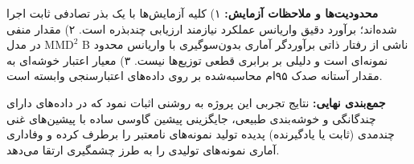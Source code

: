 \textbf{محدودیت‌ها و ملاحظات آزمایش:}
۱) کلیه آزمایش‌ها با یک بذر تصادفی ثابت اجرا شده‌اند؛ برآورد دقیق واریانس عملکرد نیازمند ارزیابی چندبذره است.
۲) مقدار منفی $\text{MMD}^2$ در مدل B ناشی از رفتار ذاتی برآوردگر آماری بدون‌سوگیری با واریانس محدود نمونه‌ای است و دلیلی بر برابری قطعی توزیع‌ها نیست.
۳) معیار اعتبار خوشه‌ای به مقدار آستانه صدک ۹۵ام محاسبه‌شده بر روی داده‌های اعتبارسنجی وابسته است.

\textbf{جمع‌بندی نهایی:} نتایج تجربی این پروژه به روشنی اثبات نمود که در داده‌های دارای چندگانگی و خوشه‌بندی طبیعی، جایگزینی پیشین گاوسی ساده با پیشین‌های غنی چندمدی (ثابت یا یادگیرنده) پدیده تولید نمونه‌های نامعتبر را برطرف کرده و وفاداری آماری نمونه‌های تولیدی را به طرز چشمگیری ارتقا می‌دهد.
